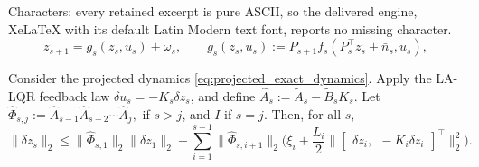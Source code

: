 \documentclass[10pt,a4paper]{amsart}
\begin{document}
Characters: every retained excerpt is pure ASCII, so the delivered engine, XeLaTeX with its default Latin Modern text font, reports no missing character.
\begin{equation}
    z_{s+1}
    =
    g_s(z_s,u_s)+\omega_s, \qquad g_s(z_s,u_s)
    :=
    P_{s+1} f_s(P_s^\top z_s+\bar n_s,u_s),
    \label{eq:projected_exact_dynamics}
\end{equation}

\begin{theorem}
\label{thm:app_latent_tracking_projection_loss}
Consider the projected dynamics \eqref{eq:projected_exact_dynamics}.
Apply the LA-LQR feedback law
$\delta u_s=-K_s\delta z_s$,
and define
$\widehat A_s:=\tilde A_s-\tilde B_sK_s$.
Let $\widehat\Phi_{s,j} := \widehat A_{s-1}\widehat A_{s-2}\cdots \widehat A_j,$ if $s>j$, and $I$ if $s = j$. 
Then, for all $s$,
\begin{equation}
    \textstyle\|\delta z_s\|_2
    \le
    \|\widehat\Phi_{s,1}\|_2\|\delta z_1\|_2
    +
    \sum_{i=1}^{s-1}
    \|\widehat\Phi_{s,i+1}\|_2
    \big(
    \xi_i
    +
    \frac{L_i}{2}
    \big\|
    \begin{bmatrix}
    \delta z_i,\ \
    -K_i\delta z_i
    \end{bmatrix}^\top
    \big\|_2^2
    \big).
    \label{eq:latent_tracking_projection_bound_2}
\end{equation}
\end{theorem}
\end{document}
